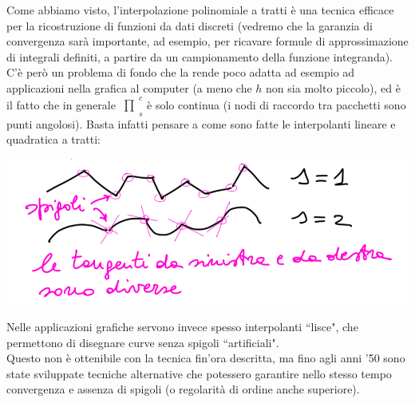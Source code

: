 \documentclass[12pt,a4paper]{article}
\newcommand{\inter}{\begin{matrix}\prod\end{matrix}}
\begin{document}
Come abbiamo visto, l'interpolazione polinomiale a tratti è una tecnica efficace per la ricostruzione di funzioni da dati discreti (vedremo che la garanzia di convergenza sarà importante, ad esempio, per ricavare formule di approssimazione di integrali definiti, a partire da un campionamento della funzione integranda).\\
C'è però un problema di fondo che la rende poco adatta ad esempio ad applicazioni nella grafica al computer (a meno che $h$ non sia molto piccolo), ed è il fatto che in generale $\inter_s^c$ è solo continua (i nodi di raccordo tra pacchetti sono punti angolosi). Basta infatti pensare a come sono fatte le interpolanti lineare e quadratica a tratti:
\begin{center}
    \includegraphics[scale=0.4]{img_pag18.png}
\end{center}
Nelle applicazioni grafiche servono invece spesso interpolanti ``lisce", che permettono di disegnare curve senza spigoli ``artificiali".\\
Questo non è ottenibile con la tecnica fin'ora descritta, ma fino agli anni '50 sono state sviluppate tecniche alternative che potessero garantire nello stesso tempo convergenza e assenza di spigoli (o regolarità di ordine anche superiore).
\end{document}
